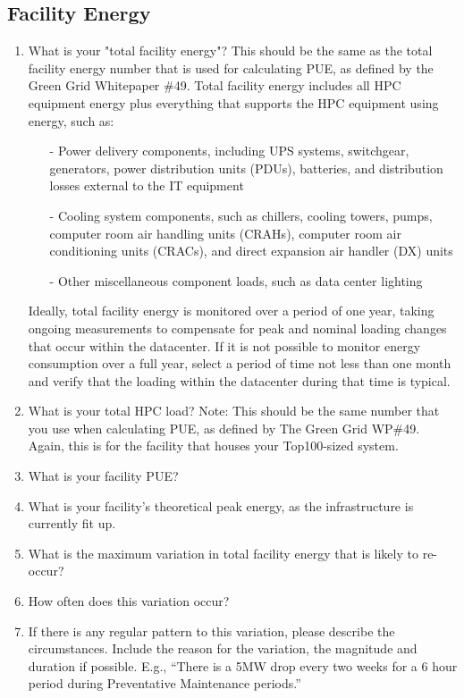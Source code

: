 \subsection{Facility Energy}
\begin{enumerate} 
\item
What is your "total facility energy"?
This should be the same as the total facility energy number that is used for 
calculating PUE, as defined by the Green Grid Whitepaper \#49.
Total facility energy includes all HPC equipment energy plus everything that supports 
the HPC equipment using energy, such as:
\begin{itemize} [nosep]
\item[{-}]
Power delivery components, including UPS systems, switchgear, generators, 
power distribution units (PDUs), batteries, and distribution losses external to the IT equipment
\item[{-}]
Cooling system components, such as chillers, cooling towers, pumps, computer 
room air handling units (CRAHs), computer room air conditioning units (CRACs), 
and direct expansion air handler (DX) units
\item[{-}]
Other miscellaneous component loads, such as data center lighting
\end{itemize}
Ideally, total facility energy is monitored over a period of one year, taking ongoing 
measurements to compensate for peak and nominal loading changes that occur within the 
datacenter. If it is not possible to monitor energy consumption over a full year, 
select a period of time not less than one month and verify that the loading within 
the datacenter during that time is typical.

\item
What is your total HPC load?
Note: This should be the same number that you use when calculating PUE, as defined 
by The Green Grid WP\#49. Again, this is for the facility that houses your Top100-sized system.

\item
What is your facility PUE?

\item
What is your facility's theoretical peak energy, as the infrastructure is currently fit up.

\item
What is the maximum variation in total facility energy that is likely to re-occur? 

\item
 How often does this variation occur?

\item
If there is any regular pattern to this variation, please describe the circumstances. 
Include the reason for the variation, the magnitude and duration if possible. 
E.g., ``There is a 5MW drop every two weeks for a 6 hour period during Preventative 
Maintenance periods.''
\end{enumerate}

